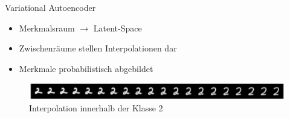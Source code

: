 \documentclass[10pt, compress]{beamer}
\begin{document}
\begin{frame}{Variational Autoencoder}
  \begin{itemize}
    \item Merkmalsraum $\rightarrow$ Latent-Space
    \item Zwischenräume stellen Interpolationen dar
    \item Merkmale probabilistisch abgebildet
  \end{itemize}
  \vfill
  \begin{figure}[hbt]
  \includegraphics[width=\textwidth]{gfx/methodology/interpolation}
  \caption{Interpolation innerhalb der Klasse 2}
\end{figure}
\end{frame}
\end{document}
